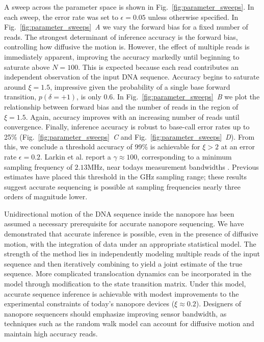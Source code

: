 \documentclass{biophys_letter}
\newcommand{\mhz}{\si{\mega\hertz}}
\newcommand{\kje}[1]{\textcolor{BurntOrange}{#1}}
\begin{document}
\begingroup
\setlength{\thickmuskip}{5mu}
A sweep across the parameter space is shown in Fig.~\ref{fig:parameter_sweeps}.
In each sweep, the error rate was set to $\epsilon=0.05$ unless otherwise specified.
In Fig.~\ref{fig:parameter_sweeps}\emph{~A} we vary the forward bias for a fixed number of reads.
The strongest determinant of inference accuracy is the forward bias, controlling how diffusive the motion is.
However, the effect of multiple reads is immediately apparent, improving the accuracy markedly until beginning to saturate above $N=100$.
This is expected because each read contributes an independent observation of the input DNA sequence.
Accuracy begins to saturate around $\xi=1.5$, impressive given the probability of a single base forward transition, $p(\delta=+1)$, is only $0.6$.
In Fig.~\ref{fig:parameter_sweeps}\emph{~B} we plot the relationship between forward bias and the number of reads in the region of $\xi=1.5$.
Again, accuracy improves with an increasing number of reads until convergence.
Finally, inference accuracy is robust to base-call error rates up to 25\% (Fig.~\ref{fig:parameter_sweeps}\emph{~C} and Fig.~\ref{fig:parameter_sweeps}\emph{~D}).
From this, we conclude a threshold accuracy of 99\% is achievable for $\xi>2$ at an error rate $\epsilon=0.2$.
Larkin et al. report a $\gamma\approx100$, corresponding to a minimum sampling frequency of $2.13\mhz$, near todays measurement bandwidths \cite{Larkin:2013}.
Previous estimates have placed this threshold in the GHz sampling range; these results suggest accurate sequencing is possible at sampling frequencies nearly three orders of magnitude lower.
\endgroup

Unidirectional motion of the DNA sequence inside the nanopore has been assumed a necessary prerequisite for accurate nanopore sequencing.
We have demonstrated that accurate inference is possible, even in the presence of diffusive motion, with the integration of data under an appropriate statistical model.
The strength of the method lies in independently modeling multiple reads of the input sequence and then iteratively combining to yield a joint estimate of the true sequence.
More complicated translocation dynamics can be incorporated in the model through modification to the state transition matrix.
\kje{Under this model, accurate sequence inference is achievable with modest improvements to the experimental constraints of today's nanopore devices ($\xi\approx 0.2$).
Designers of nanopore sequencers should emphasize improving sensor bandwidth, as techniques such as the random walk model can account for diffusive motion and maintain high accuracy reads.}
\end{document}
